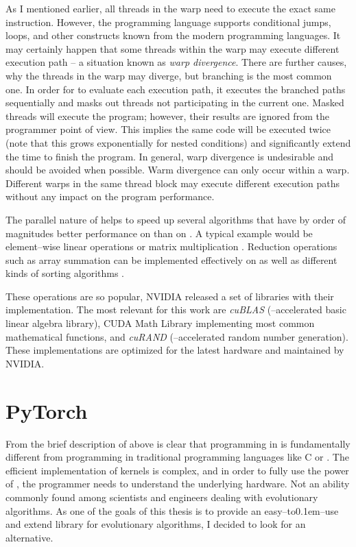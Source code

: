 As I mentioned earlier, all threads in the warp need to execute the exact same instruction. However, the programming language supports conditional jumps, loops, and other constructs known from the modern programming languages. It may certainly happen that some threads within the warp may execute different execution path -- a situation known as \emph{warp divergence}. There are further causes, why the threads in the warp may diverge, but branching is the most common one. In order for \gpu to evaluate each execution path, it executes the branched paths sequentially and masks out threads not participating in the current one. Masked threads will execute the program; however, their results are ignored from the programmer point of view. This implies the same code will be executed twice (note that this grows exponentially for nested conditions) and significantly extend the time to finish the program. In general, warp divergence is undesirable and should be avoided when possible.
Warm divergence can only occur within a warp. Different warps in the same thread block may execute different execution paths without any impact on the program performance.

The parallel nature of \cuda helps to speed up several algorithms that have by order of magnitudes better performance on \gpu than on \cpuns. A typical example would be element--wise linear operations or matrix multiplication \citep{GPUMatrixMultiplication}. Reduction operations such as array summation can be implemented effectively on \gpu \citep{harris2007optimizing} as well as different kinds of sorting algorithms \citep{GPUsorting}.

These operations are so popular, NVIDIA released a set of libraries with their implementation. The most relevant for this work are \textit{cuBLAS} (\gpuns--accelerated basic linear algebra library), CUDA Math Library implementing most common mathematical functions, and \textit{cuRAND} (\cpuns--accelerated random number generation). These implementations are optimized for the latest hardware and maintained by NVIDIA.




\section{PyTorch}

From the brief description of \cuda above is clear that programming in \cuda is fundamentally different from programming in traditional programming languages like C or \cppns. The efficient implementation of kernels is complex, and in order to fully use the power of \gpuns, the programmer needs to understand the underlying hardware. Not an ability commonly found among scientists and engineers dealing with evolutionary algorithms. As one of the goals of this thesis is to provide an easy--to\kern0.1em--use and extend library for evolutionary algorithms, I decided to look for an alternative.

